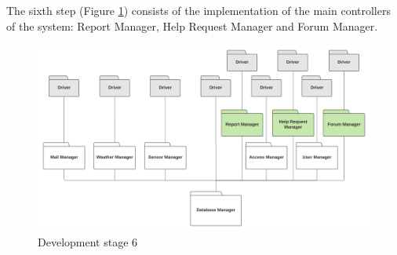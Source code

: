 \documentclass[10pt]{article} %
\begin{document}
The sixth step (Figure \ref{fig:impl6}) consists of the implementation of the main controllers of the system: Report Manager, Help Request Manager and Forum Manager.
\begin{figure}[h!]
    \centering
    \centerline{\includegraphics[scale=0.4]{images/impl/step6.png}}
    \caption{Development stage 6}
    \label{fig:impl6}
\end{figure}
\newpage
\end{document}
